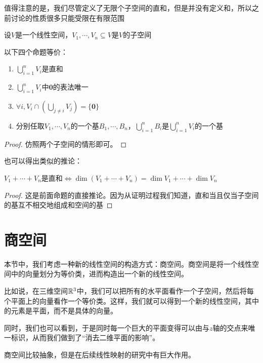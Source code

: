 \documentclass[12pt, a4paper, oneside, UTF8]{ctexbook}
\begin{document}
\begin{para}{0}
					值得注意的是，我们尽管定义了无限个子空间的直和，但是并没有定义和，所以之前讨论的性质很多只能受限在有限范围
				\point{}
					\begin{proposition}
						设$V$是一个线性空间，$V_1,\cdots,V_n \subseteq V$是$V$的子空间

						以下四个命题等价：

						\begin{enumerate}
							\item $\bigcup\limits_{i=1}^{n} V_i$是直和
							\item $\bigcup\limits_{i=1}^{n} V_i$中$\mathbf{0}$的表法唯一
							\item $\forall i,V_i \cap (\bigcup\limits_{j\neq i} V_j) = \{\mathbf{0}\}$
							\item 分别任取$V_1,\cdots,V_n$的一个基$B_1,\cdots,B_n$，$\bigcup\limits_{i=1}^{n} B_i$是$\bigcup\limits_{i=1}^{n} V_i$的一个基
						\end{enumerate}
					\end{proposition}
					\begin{proof}
						仿照两个子空间的情形即可。
					\end{proof}
					也可以得出类似的推论：
					\begin{corollary}{}{}
						$V_1 + \cdots + V_n$是直和$\Leftrightarrow \dim (V_1+\cdots+V_n)=\dim V_1 + \cdots + \dim V_n$
					\end{corollary}
					\begin{proof}
						这是前面命题的直接推论。因为从证明过程我们知道，直和当且仅当子空间的基互不相交地组成和空间的基
					\end{proof}
			\end{para}
	\section{商空间}
		本节中，我们考虑一种新的线性空间的构造方式：商空间。商空间是将一个线性空间中的向量划分为等价类，进而构造出一个新的线性空间。

		比如说，在三维空间$\mathbb{R}^3$中，我们可以把所有的水平面看作一个子空间，然后将每个平面上的向量看作一个等价类。这样，我们就可以得到一个新的线性空间，其中的元素是平面，而不是具体的向量。

		同时，我们也可以看到，于是同时每一个巨大的平面变得可以由与$z$轴的交点来唯一标识，从而我们做到了“消去二维平面的影响”。

		商空间比较抽象，但是在后续线性映射的研究中有巨大作用。
\end{document}
